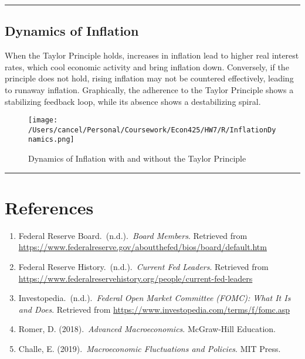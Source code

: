\documentclass{article}
\begin{document}
\noindent\rule{\linewidth}{0.5pt}

\subsection{Dynamics of Inflation}
When the Taylor Principle holds, increases in inflation lead to higher real interest rates, which cool economic activity and bring inflation down. Conversely, if the principle does not hold, rising inflation may not be countered effectively, leading to runaway inflation. Graphically, the adherence to the Taylor Principle shows a stabilizing feedback loop, while its absence shows a destabilizing spiral.
\clearpage
\begin{figure}[ht!]
    \centering
    \texttt{[image: /Users/cancel/Personal/Coursework/Econ425/HW7/R/InflationDynamics.png]}
    \caption{Dynamics of Inflation with and without the Taylor Principle}
\label{fig:inflationdynamics}
\end{figure}

\noindent\rule{\linewidth}{1pt}
\clearpage
\section*{References}
\begin{enumerate}
    \item Federal Reserve Board.\ (n.d.).\ \textit{Board Members}. Retrieved from \url{https://www.federalreserve.gov/aboutthefed/bios/board/default.htm}
    \item Federal Reserve History.\ (n.d.).\ \textit{Current Fed Leaders}. Retrieved from \url{https://www.federalreservehistory.org/people/current-fed-leaders}
    \item Investopedia.\ (n.d.).\ \textit{Federal Open Market Committee (FOMC): What It Is and Does}. Retrieved from \url{https://www.investopedia.com/terms/f/fomc.asp}
    \item Romer, D. (2018).\ \textit{Advanced Macroeconomics}. McGraw-Hill Education.
    \item Challe, E. (2019).\ \textit{Macroeconomic Fluctuations and Policies}. MIT Press.
\end{enumerate}
\end{document}
